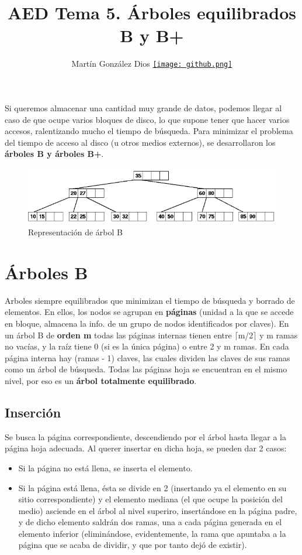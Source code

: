 \documentclass{article}
\title{AED Tema 5. Árboles equilibrados B y B+}
\author{Martín González Dios
\href{https://github.com/martindios}{\texttt{[image: github.png]}}}
\begin{document}
\maketitle

Si queremos almacenar una cantidad muy grande de datos, podemos llegar al caso de que ocupe
varios bloques de disco, lo que supone tener que hacer varios accesos, ralentizando mucho el
tiempo de búsqueda. Para minimizar el problema del tiempo de acceso al disco (u otros medios
externos), se desarrollaron los \textbf{árboles B y árboles B+}.

\begin{figure}
    \centering
    \includegraphics[width=\linewidth]{img-t5/img_357_90.png}
    \caption{Representación de árbol B}
\end{figure}

\section{Árboles B}
Arboles siempre equilibrados que minimizan el tiempo de búsqueda y borrado de elementos. En ellos, los nodos se agrupan en \textbf{páginas} (unidad a la que se accede en bloque, almacena la info. de un grupo de nodos identificados por claves). En un árbol B de \textbf{orden m} todas las páginas internas tienen entre $\lceil$m/2$\rceil$ y m ramas no vacías, y la raíz tiene 0 (si es la única página) o entre 2 y m ramas. En cada página interna hay (ramas - 1) claves, las cuales dividen las claves de sus ramas como un árbol de búsqueda. Todas las páginas hoja se encuentran en el mismo nivel, por eso es un \textbf{árbol totalmente equilibrado}.\\

\subsection{Inserción}
Se busca la página correspondiente, descendiendo por el árbol hasta llegar a la página hoja adecuada. Al querer insertar en dicha hoja, se pueden dar 2 casos:
\begin{itemize}
    \item Si la página no está llena, se inserta el elemento.
    \item Si la página está llena, ésta se divide en 2 (insertando ya el elemento en su sitio correspondiente) y el elemento mediana (el que ocupe la posición del medio) asciende en el árbol al nivel superiro, insertándose en la página padre, y de dicho elemento saldrán dos ramas, una a cada página generada en el elemento inferior (eliminándose, evidentemente, la rama que apuntaba a la página que se acaba de dividir, y que por tanto dejó de existir).
\end{itemize}
\end{document}
